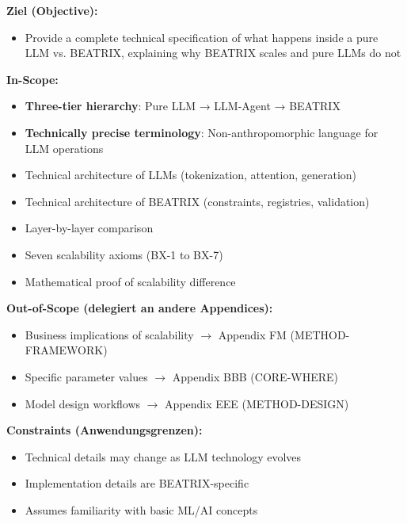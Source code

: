 \begin{tcolorbox}[
    colback=orange!5!white,
    colframe=orange!75!black,
    title={\textbf{Appendix Scope: Ziel / In-Scope / Out-of-Scope / Constraints}},
    fonttitle=\bfseries
]

\textbf{Ziel (Objective):}
\begin{itemize}[nosep]
    \item Provide a complete technical specification of what happens inside a pure LLM vs. BEATRIX, explaining why BEATRIX scales and pure LLMs do not
\end{itemize}

\textbf{In-Scope:}
\begin{itemize}[nosep]
    \item \textbf{Three-tier hierarchy}: Pure LLM → LLM-Agent → BEATRIX
    \item \textbf{Technically precise terminology}: Non-anthropomorphic language for LLM operations
    \item Technical architecture of LLMs (tokenization, attention, generation)
    \item Technical architecture of BEATRIX (constraints, registries, validation)
    \item Layer-by-layer comparison
    \item Seven scalability axioms (BX-1 to BX-7)
    \item Mathematical proof of scalability difference
\end{itemize}

\textbf{Out-of-Scope (delegiert an andere Appendices):}
\begin{itemize}[nosep]
    \item Business implications of scalability $\rightarrow$ Appendix FM (METHOD-FRAMEWORK)
    \item Specific parameter values $\rightarrow$ Appendix BBB (CORE-WHERE)
    \item Model design workflows $\rightarrow$ Appendix EEE (METHOD-DESIGN)
\end{itemize}

\textbf{Constraints (Anwendungsgrenzen):}
\begin{itemize}[nosep]
    \item Technical details may change as LLM technology evolves
    \item Implementation details are BEATRIX-specific
    \item Assumes familiarity with basic ML/AI concepts
\end{itemize}


\end{tcolorbox}
